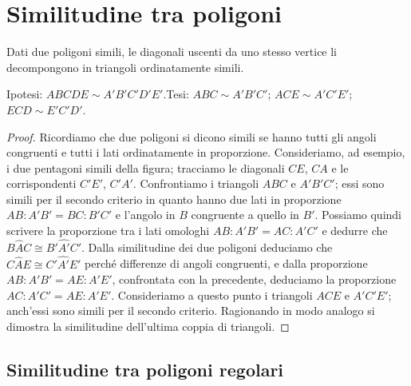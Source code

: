 \section{Similitudine tra poligoni}
\label{sect:similitudine_poligoni}

\begin{teorema}
Dati due poligoni simili, le diagonali uscenti da uno stesso vertice 
li decompongono in triangoli ordinatamente simili.
\end{teorema}

\noindent Ipotesi: \(ABCDE\sim A'B'C'D'E'\).\qquad Tesi: \(ABC\sim 
A'B'C'\); \(ACE\sim A'C'E'\); \(ECD\sim E'C'D'\).

\begin{center}
\scalebox{.8}{}
\end{center}


\begin{proof}
Ricordiamo che due poligoni si dicono simili se hanno tutti gli 
angoli congruenti e tutti i lati ordinatamente in proporzione. 
Consideriamo, ad esempio, i due pentagoni simili della figura; 
tracciamo le diagonali \(CE\), \(CA\) e le corrispondenti \(C'E'\), \(C'A'\). 
Confrontiamo i triangoli \(ABC\) e \(A'B'C'\); essi sono simili per il 
secondo criterio in quanto hanno due lati in proporzione \(AB : A'B' = 
BC : B'C'\) e l'angolo in \(B\) congruente a quello in \(B'\). Possiamo 
quindi scrivere la proporzione tra i lati omologhi \(AB : A'B' = AC : 
A'C'\) e dedurre che \(B\widehat{A}C\cong B'\widehat{A'}C'\). Dalla 
similitudine dei due poligoni deduciamo che \(C\widehat{A}E\cong 
C'\widehat{A'}E'\) perché differenze di angoli congruenti, e dalla 
proporzione \(AB:A'B'=AE:A'E'\), confrontata con la precedente, 
deduciamo la proporzione \(AC:A'C'=AE:A'E'\). Consideriamo a questo 
punto i triangoli \(ACE\) e \(A'C'E'\); anch'essi sono simili per il 
secondo criterio. Ragionando in modo analogo si dimostra la 
similitudine dell'ultima coppia di triangoli.
\end{proof}

\subsection{Similitudine tra poligoni regolari}

